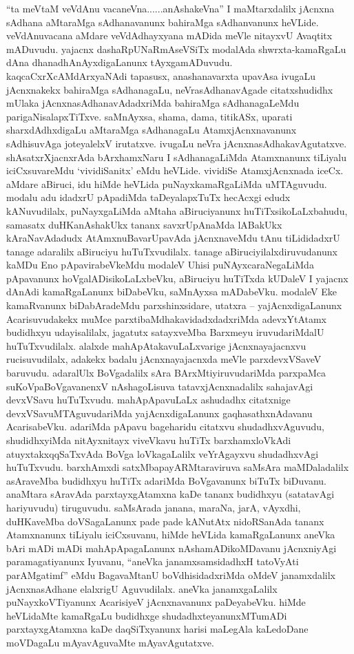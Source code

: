 \begin{artha}
``ta meVtaM veVdAnu vacaneVna......anAshakeVna'' I maMtarxdalilx jAcnxna sAdhana aMtaraMga sAdhanavanunx bahiraMga sAdhanvanunx heVLide. veVdAnuvacana aMdare veVdAdhayxyana mADida meVle nitayxvU Avaqtitx mADuvudu. yajacnx dashaRpUNaRmAseVSiTx modalAda shwrxta-kamaRgaLu dAna dhanadhAnAyxdigaLanunx tAyxgamADuvudu. kaqcaCxrXcAMdArxyaNAdi tapasusx, anashanavarxta upavAsa ivugaLu jAcnxnakekx bahiraMga sAdhanagaLu, neVrasAdhanavAgade citatxshudidhx mUlaka jAcnxnasAdhanavAdadxriMda bahiraMga sAdhanagaLeMdu parigaNisalapxTiTxve. saMnAyxsa, shama, dama, titikASx, uparati sharxdAdhxdigaLu aMtaraMga sAdhanagaLu AtamxjAcnxnavanunx sAdhisuvAga joteyalelxV irutatxve. ivugaLu neVra jAcnxnasAdhakavAgutatxve. shAsatxrXjacnxrAda bArxhamxNaru I sAdhanagaLiMda Atamxnanunx tiLiyalu iciCxsuvareMdu `vividiSanitx' eMdu heVLide. vividiSe AtamxjAcnxnada iceCx. aMdare aBiruci, idu hiMde heVLida puNayxkamaRgaLiMda uMTAguvudu. modalu adu idadxrU pApadiMda taDeyalapxTuTx hecAcxgi edudx kANuvudilalx, puNayxgaLiMda aMtaha aBiruciyanunx huTiTxsikoLaLxbahudu, samasatx duHKanAshakUkx tananx savxrUpAnaMda lABakUkx kAraNavAdadudx AtAmxnuBavarUpavAda jAcnxnaveMdu tAnu tiLididadxrU tanage adaralilx aBiruciyu huTuTxvudilalx. tanage aBiruciyilalxdiruvudanunx kaMDu Eno pApavirabeVkeMdu modaleV Uhisi puNAyxcaraNegaLiMda pApavanunx hoVgalADisikoLaLxbeVku, aBiruciyu huTiTxda kUDaleV I yajacnx dAnAdi kamaRgaLanunx biDabeVku, saMnAyxsa mADabeVku. modaleV Eke kamaRvanunx biDabAradeMdu parxshinxsidare, utatxra -- yajAcnxdigaLanunx Acarisuvudakekx muMce parxtibaMdhakavidadxdadxriMda adevxYtAtamx budidhxyu udayisalilalx, jagatutx satayxveMba Barxmeyu iruvudariMdalU huTuTxvudilalx. alalxde mahApAtakavuLaLxvarige jAcnxnayajacnxvu rucisuvudilalx, adakekx badalu jAcnxnayajacnxda meVle parxdevxVSaveV baruvudu. adaralUlx BoVgadalilx sAra BArxMtiyiruvudariMda parxpaMca suKoVpaBoVgavanenxV nAshagoLisuva tatavxjAcnxnadalilx sahajavAgi devxVSavu huTuTxvudu. mahApApavuLaLx ashudadhx citatxnige devxVSavuMTAguvudariMda yajAcnxdigaLanunx gaqhasathxnAdavanu AcarisabeVku. adariMda pApavu bageharidu citatxvu shudadhxvAguvudu, shudidhxyiMda nitAyxnitayx viveVkavu huTiTx barxhamxloVkAdi atuyxtakxqqSaTxvAda BoVga loVkagaLalilx veYrAgayxvu shudadhxvAgi huTuTxvudu. barxhAmxdi satxMbapayARMtaraviruva saMsAra maMDaladalilx asAraveMba budidhxyu huTiTx adariMda BoVgavanunx biTuTx biDuvanu. anaMtara sAravAda parxtayxgAtamxna kaDe tananx budidhxyu (satatavAgi hariyuvudu) tiruguvudu. saMsArada janana, maraNa, jarA, vAyxdhi, duHKaveMba doVSagaLanunx pade pade kANutAtx nidoRSanAda tananx Atamxnanunx tiLiyalu iciCxsuvanu, hiMde heVLida kamaRgaLanunx aneVka bAri mADi mADi mahApApagaLanunx nAshamADikoMDavanu jAcnxniyAgi paramagatiyanunx Iyuvanu, ``aneVka janamxsamsidadhxH tatoVyAti parAMgatimf'' eMdu BagavaMtanU boVdhisidadxriMda oMdeV janamxdalilx jAcnxnasAdhane elalxrigU Aguvudilalx. aneVka janamxgaLalilx puNayxkoVTiyanunx AcarisiyeV jAcnxnavanunx paDeyabeVku. hiMde heVLidaMte kamaRgaLu budidhxge shudadhxteyanunxMTumADi parxtayxgAtamxna kaDe daqSiTxyanunx harisi maLegAla kaLedoDane moVDagaLu mAyavAguvaMte mAyavAgutatxve.
\end{artha}

